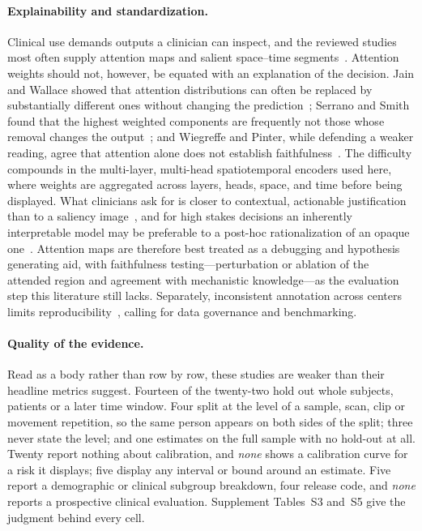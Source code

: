 \documentclass[journal]{IEEEtran}
\begin{document}
\paragraph{Explainability and standardization.} Clinical use demands outputs a clinician can inspect, and the reviewed studies most often supply attention maps and salient space--time segments~\cite{2,4}. Attention weights should not, however, be equated with an explanation of the decision. Jain and Wallace showed that attention distributions can often be replaced by substantially different ones without changing the prediction~\cite{jain2019attention}; Serrano and Smith found that the highest weighted components are frequently not those whose removal changes the output~\cite{serrano2019attention}; and Wiegreffe and Pinter, while defending a weaker reading, agree that attention alone does not establish faithfulness~\cite{wiegreffe2019attention}. The difficulty compounds in the multi-layer, multi-head spatiotemporal encoders used here, where weights are aggregated across layers, heads, space, and time before being displayed. What clinicians ask for is closer to contextual, actionable justification than to a saliency image~\cite{tonekaboni2019clinicians}, and for high stakes decisions an inherently interpretable model may be preferable to a post-hoc rationalization of an opaque one~\cite{rudin2019stopexplaining}. Attention maps are therefore best treated as a debugging and hypothesis generating aid, with faithfulness testing---perturbation or ablation of the attended region and agreement with mechanistic knowledge---as the evaluation step this literature still lacks. Separately, inconsistent annotation across centers limits reproducibility~\cite{6}, calling for data governance and benchmarking.

\fi

\paragraph{Quality of the evidence.} Read as a body rather than row by row, these studies are weaker than their headline metrics suggest. Fourteen of the twenty-two hold out whole subjects, patients or a later time window. Four split at the level of a sample, scan, clip or movement repetition, so the same person appears on both sides of the split; three never state the level; and one estimates on the full sample with no hold-out at all. Twenty report nothing about calibration, and \emph{none} shows a calibration curve for a risk it displays; five display any interval or bound around an estimate. Five report a demographic or clinical subgroup breakdown, four release code, and \emph{none} reports a prospective clinical evaluation. Supplement Tables~S3 and~S5 give the judgment behind every cell.
\end{document}
